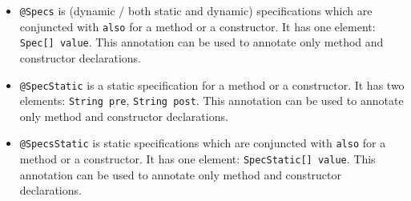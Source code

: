 \documentclass{article}
\begin{document}
\begin{itemize}
\item \texttt{@Specs} is (dynamic / both static and dynamic) specifications which are conjuncted with \texttt{also} for a method or a constructor. It has one element: \texttt{Spec[] value}. This annotation can be used to annotate only method and constructor declarations.
\item \texttt{@SpecStatic} is a static specification for a method or a constructor. It has two elements: \texttt{String pre}, \texttt{String post}. This annotation can be used to annotate only method and constructor declarations.
\item \texttt{@SpecsStatic} is static specifications which are conjuncted with \texttt{also} for a method or a constructor. It has one element: \texttt{SpecStatic[] value}. This annotation can be used to annotate only method and constructor declarations.
\end{itemize}
\end{document}
